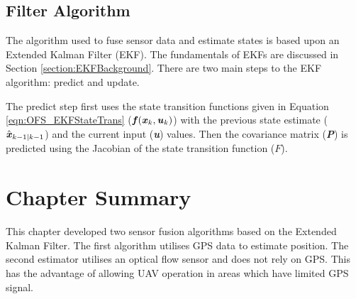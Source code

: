 \subsection{Filter Algorithm}
The algorithm used to fuse sensor data and estimate states is based upon an Extended Kalman Filter (EKF). The fundamentals of EKFs are discussed in Section \ref{section:EKFBackground}. There are two main steps to the EKF algorithm: predict and update.

The predict step first uses the state transition functions given in Equation \ref{eqn:OFS_EKFStateTrans} ($\textbf{\textit{f}}(\textbf{\textit{x}}_{k},\textbf{\textit{u}}_{k})$) with the previous state estimate ($\hat{\textbf{\textit{x}}}_{k-1|k-1}$) and the current input (\textbf{\textit{u}}) values. Then the covariance matrix (\textbf{\textit{P}}) is predicted using the Jacobian of the state transition function ($F$).






\section{Chapter Summary}
This chapter developed two sensor fusion algorithms based on the Extended Kalman Filter. The first algorithm utilises GPS data to estimate position. The second estimator utilises an optical flow sensor and does not rely on GPS. This has the advantage of allowing UAV operation in areas which have limited GPS signal.

\clearpage


